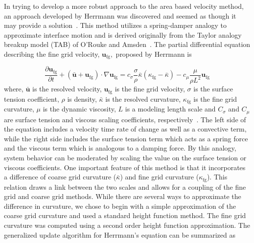 In trying to develop a more robust approach to the area based velocity method, an approach developed by Herrmann was discovered and seemed as though it may provide a  solution~\cite{Herrmann2013}. This method utilizes a spring-damper analogy to approximate interface motion and is derived  originally from the Taylor analogy breakup model (TAB) of O'Rouke and Amsden~\cite{TAB}. The partial differential equation describing the fine grid velocity, $\bm{u}_{\text{fg}},$ proposed by Herrmann  is 

\begin{equation}
\frac{\partial \bm{u}_{\text{fg}}}{\partial t} +
(\bar{\bm{u}}+\bm{u}_{\text{fg}}) \cdot \nabla \bm{u}_{\text{fg}} =
c_{\sigma}\frac{\sigma}{\rho}\bar{\kappa}(\kappa_{\text{fg}}-\bar{\kappa})- 
c_{\mu}\frac{\mu}{\rho L^2}\bm{u}_{\text{fg}}
\label{eqn:HermEq}
\end{equation}
where, $\bar{\bm{u}}$ is the resolved velocity,
$\bm{u}_{\text{fg}}$ is the fine grid velocity,
$\sigma$ is the surface tension coefficient,
$\rho$ is density, 
$\bar{\kappa}$ is the resolved curvature,
$\kappa_{\text{fg}}$ is the fine grid curvature,
$\mu$ is the dynamic viscosity,
$L$ is a modeling length scale and
$C_\sigma$ and
$C_\mu$ are surface tension and viscous scaling coefficients, respectively~\cite{Herrmann2013}. 
The left side of the equation includes a velocity time rate of change as well as a convective term, while the right side includes the surface tension term which acts as a spring force and the viscous term which is analogous to a damping force. By this analogy, system behavior can be moderated by scaling the value on the surface tension or viscous coefficients. One important feature of this method is that it incorporates a difference of coarse grid curvature ($\bar{\kappa}$) and fine grid curvature ($\kappa_{\text{fg}}$). This relation draws a link between the two scales and allows for a coupling of the fine grid and coarse grid methods. While there are several ways to approximate the difference in curvature, we chose to begin with a simple approximation of the coarse grid curvature and used a standard height function method. The fine grid curvature was computed using a second order height function approximation. The generalized update algorithm for Herrmann's equation can be summarized as 
